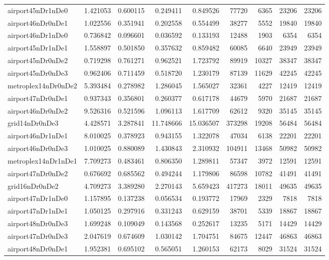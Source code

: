 \begin{longtable}{|l|r|r|r|r|r|r|r|r|}
airport45nDr1nDe0 & 1.421053 & 0.600115 & 0.249411 & 0.849526 & 77720 & 6365 & 23206 & 23206 \\
airport46nDr0nDe1 & 1.022556 & 0.351941 & 0.202558 & 0.554499 & 38277 & 5552 & 19840 & 19840 \\
airport46nDr1nDe0 & 0.736842 & 0.096601 & 0.036592 & 0.133193 & 12488 & 1903 & 6354 & 6354 \\
airport45nDr1nDe1 & 1.558897 & 0.501850 & 0.357632 & 0.859482 & 60085 & 6640 & 23949 & 23949 \\
airport45nDr0nDe2 & 0.719298 & 0.761271 & 0.962521 & 1.723792 & 89919 & 10327 & 38347 & 38347 \\
airport45nDr0nDe3 & 0.962406 & 0.711459 & 0.518720 & 1.230179 & 87139 & 11629 & 42245 & 42245 \\
metroplex14nDr0nDe2 & 5.393484 & 0.278982 & 1.286045 & 1.565027 & 32361 & 4227 & 12419 & 12419 \\
airport47nDr0nDe1 & 0.937343 & 0.356801 & 0.260377 & 0.617178 & 44679 & 5970 & 21687 & 21687 \\
airport46nDr0nDe2 & 9.526316 & 0.521596 & 1.096113 & 1.617709 & 62612 & 9320 & 35145 & 35145 \\
grid14nDr0nDe3 & 4.428571 & 3.287841 & 11.748666 & 15.036507 & 373298 & 19208 & 56484 & 56484 \\
airport46nDr1nDe1 & 8.010025 & 0.378923 & 0.943155 & 1.322078 & 47034 & 6138 & 22201 & 22201 \\
airport46nDr0nDe3 & 1.010025 & 0.880089 & 1.430843 & 2.310932 & 104911 & 13468 & 50982 & 50982 \\
metroplex14nDr1nDe1 & 7.709273 & 0.483461 & 0.806350 & 1.289811 & 57347 & 3972 & 12591 & 12591 \\
airport47nDr0nDe2 & 0.676692 & 0.685562 & 0.494244 & 1.179806 & 86598 & 10782 & 41491 & 41491 \\
grid16nDr0nDe2 & 4.709273 & 3.389280 & 2.270143 & 5.659423 & 417273 & 18011 & 49635 & 49635 \\
airport47nDr1nDe0 & 1.157895 & 0.137238 & 0.056534 & 0.193772 & 17969 & 2329 & 7818 & 7818 \\
airport47nDr1nDe1 & 1.050125 & 0.297916 & 0.331243 & 0.629159 & 38701 & 5339 & 18867 & 18867 \\
airport48nDr0nDe3 & 1.699248 & 0.109049 & 0.143568 & 0.252617 & 13235 & 5171 & 14429 & 14429 \\
airport47nDr0nDe3 & 2.047619 & 0.674609 & 1.030142 & 1.704751 & 84675 & 12447 & 46863 & 46863 \\
airport48nDr0nDe1 & 1.952381 & 0.695102 & 0.565051 & 1.260153 & 62173 & 8029 & 31524 & 31524 \\

\end{longtable}
